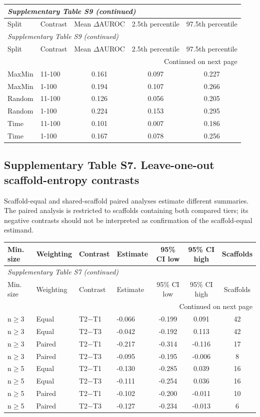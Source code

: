 \begin{longtable}{llccc}
\multicolumn{5}{l}{\textit{Supplementary Table S9 (continued)}} \\
\toprule Split & Contrast & Mean $\Delta$AUROC & 2.5th percentile & 97.5th percentile \\ \midrule\endfirsthead
\multicolumn{5}{l}{\textit{Supplementary Table S9 (continued)}} \\
\toprule Split & Contrast & Mean $\Delta$AUROC & 2.5th percentile & 97.5th percentile \\ \midrule\endhead
\midrule\multicolumn{5}{r}{Continued on next page}\\\endfoot
\bottomrule\endlastfoot
MaxMin & 11-100 & 0.161 & 0.097 & 0.227 \\
MaxMin & 1-100 & 0.194 & 0.107 & 0.266 \\
Random & 11-100 & 0.126 & 0.056 & 0.205 \\
Random & 1-100 & 0.224 & 0.153 & 0.295 \\
Time & 11-100 & 0.101 & 0.007 & 0.186 \\
Time & 1-100 & 0.167 & 0.078 & 0.256 \\
\end{longtable}
\subsection*{Supplementary Table S7. Leave-one-out scaffold-entropy contrasts}
Scaffold-equal and shared-scaffold paired analyses estimate different summaries. The paired analysis is restricted to scaffolds containing both compared tiers; its negative contrasts should not be interpreted as confirmation of the scaffold-equal estimand.
\begin{longtable}{llllccc}

\toprule Min. size & Weighting & Contrast & Estimate & 95\% CI low & 95\% CI high & Scaffolds \\ \midrule\endfirsthead
\multicolumn{7}{l}{\textit{Supplementary Table S7 (continued)}} \\
\toprule Min. size & Weighting & Contrast & Estimate & 95\% CI low & 95\% CI high & Scaffolds \\ \midrule\endhead
\midrule\multicolumn{7}{r}{Continued on next page}\\\endfoot
\bottomrule\endlastfoot
n$\geq$3 & Equal & T2$-$T1 & -0.066 & -0.199 & 0.091 & 42 \\
n$\geq$3 & Equal & T2$-$T3 & -0.042 & -0.192 & 0.113 & 42 \\
n$\geq$3 & Paired & T2$-$T1 & -0.217 & -0.314 & -0.116 & 17 \\
n$\geq$3 & Paired & T2$-$T3 & -0.095 & -0.195 & -0.006 & 8 \\
n$\geq$5 & Equal & T2$-$T1 & -0.130 & -0.285 & 0.039 & 16 \\
n$\geq$5 & Equal & T2$-$T3 & -0.111 & -0.254 & 0.036 & 16 \\
n$\geq$5 & Paired & T2$-$T1 & -0.102 & -0.200 & -0.011 & 10 \\
n$\geq$5 & Paired & T2$-$T3 & -0.127 & -0.234 & -0.013 & 6 \\
\end{longtable}

